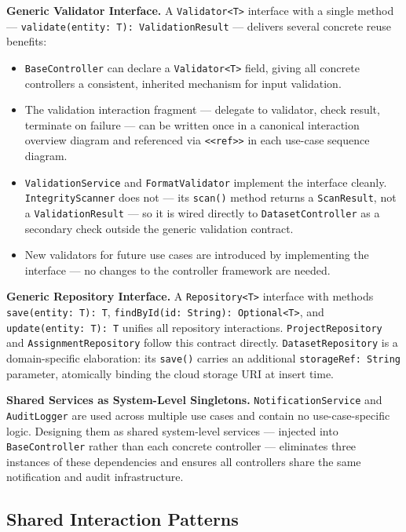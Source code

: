 \documentclass[12pt,a4paper]{article}
\newcommand{\code}[1]{\texttt{\small #1}}
\begin{document}
\noindent\textbf{Generic Validator Interface.}
A \code{Validator<T>} interface with a single method --- \code{validate(entity: T): ValidationResult} --- delivers several concrete reuse benefits:

\begin{itemize}
  \item \code{BaseController} can declare a \code{Validator<T>} field, giving all concrete controllers a consistent, inherited mechanism for input validation.
  \item The validation interaction fragment --- delegate to validator, check result, terminate on failure --- can be written once in a canonical interaction overview diagram and referenced via \code{<<ref>>} in each use-case sequence diagram.
  \item \code{ValidationService} and \code{FormatValidator} implement the interface cleanly. \code{IntegrityScanner} does not --- its \code{scan()} method returns a \code{ScanResult}, not a \code{ValidationResult} --- so it is wired directly to \code{DatasetController} as a secondary check outside the generic validation contract.
  \item New validators for future use cases are introduced by implementing the interface --- no changes to the controller framework are needed.
\end{itemize}

\noindent\textbf{Generic Repository Interface.}
A \code{Repository<T>} interface with methods \code{save(entity: T): T}, \code{findById(id: String): Optional<T>}, and \code{update(entity: T): T} unifies all repository interactions. \code{ProjectRepository} and \code{AssignmentRepository} follow this contract directly. \code{DatasetRepository} is a domain-specific elaboration: its \code{save()} carries an additional \code{storageRef: String} parameter, atomically binding the cloud storage URI at insert time.

\noindent\textbf{Shared Services as System-Level Singletons.}
\code{NotificationService} and \code{AuditLogger} are used across multiple use cases and contain no use-case-specific logic. Designing them as shared system-level services --- injected into \code{BaseController} rather than each concrete controller --- eliminates three instances of these dependencies and ensures all controllers share the same notification and audit infrastructure.

\subsection{Shared Interaction Patterns}
\end{document}
